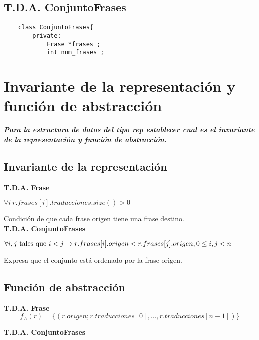 \subsection{T.D.A. ConjuntoFrases}
\begin{lstlisting}
	class ConjuntoFrases{
		private:
			Frase *frases ;     
			int num_frases ;
\end{lstlisting}


\section{Invariante de la representación y función de abstracción}
\textbf{\textit{ Para la estructura de datos del tipo rep
		establecer cual es el invariante de la
		representación y función de abstracción.}}

\subsection{Invariante de la representación}
\textbf{T.D.A. Frase}
\begin{center}
	$\forall i \ r.frases[i].traducciones.size() > 0$
\end{center} 
Condición de que cada frase origen tiene una frase destino.
\\

\textbf{T.D.A. ConjuntoFrases}
\begin{center}
	$\forall i,j \ \textup{tales que } i < j \rightarrow r.frases[i].origen < r.frases[j].origen, 0 \leq i,j < n$
\end{center} 
Expresa que el conjunto está ordenado por la frase origen.

\newpage

\subsection{Función de abstracción}
\textbf{T.D.A. Frase}
\begin{displaymath}
f_{A}(r) =\{(r.origen;r.traducciones[0], ... , r.traducciones[n-1])\}
\end{displaymath}

\textbf{T.D.A. ConjuntoFrases}

